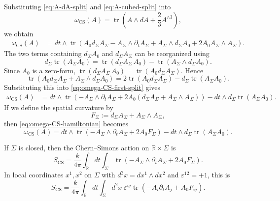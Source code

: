 \documentclass[11pt]{article}
\newcommand{\R}{\mathbb{R}}
\newcommand{\tr}{\operatorname{tr}}
\newcommand{\CS}{\operatorname{CS}}
\theoremstyle{definition}
\numberwithin{theorem}{section}
\numberwithin{equation}{section}
\let\del\partial
\begin{document}
\noindent Substituting \eqref{eq:A-dA-split} and \eqref{eq:A-cubed-split} into
\begin{equation*}
\omega_{\CS}(A) = \tr\left(A\wedge dA + \frac{2}{3}A^{\wedge 3}\right),
\end{equation*}
we obtain
\begin{align}
\omega_{\CS}(A)
&=
dt\wedge \tr\left(
A_0 d_\Sigma A_\Sigma
- A_\Sigma\wedge \del_t A_\Sigma
+ A_\Sigma\wedge d_\Sigma A_0
+ 2A_0A_\Sigma\wedge A_\Sigma\right).
\label{eq:omega-CS-first-split}
\end{align}
The two terms containing $d_\Sigma A_0$ and $d_\Sigma A_\Sigma$ can be reorganized using
\begin{equation*}
d_\Sigma\tr(A_\Sigma A_0)
=
\tr(d_\Sigma A_\Sigma\,A_0) - \tr(A_\Sigma\wedge d_\Sigma A_0).
\end{equation*}
Since $A_0$ is a zero-form, $\tr(d_\Sigma A_\Sigma\,A_0)=\tr(A_0 d_\Sigma A_\Sigma)$. Hence
\begin{equation*}
\tr(A_0 d_\Sigma A_\Sigma + A_\Sigma\wedge d_\Sigma A_0)
=
2\tr(A_0 d_\Sigma A_\Sigma) - d_\Sigma\tr(A_\Sigma A_0).
\end{equation*}
Substituting this into \eqref{eq:omega-CS-first-split} gives
\begin{align}
\omega_{\CS}(A)
&=
dt\wedge \tr\left(
-A_\Sigma\wedge \del_t A_\Sigma
+ 2A_0(d_\Sigma A_\Sigma + A_\Sigma\wedge A_\Sigma)\right)
- dt\wedge d_\Sigma\tr(A_\Sigma A_0).
\label{eq:omega-CS-hamiltonian}
\end{align}
If we define the spatial curvature by
\begin{equation*}
F_\Sigma := d_\Sigma A_\Sigma + A_\Sigma\wedge A_\Sigma,
\end{equation*}
then \eqref{eq:omega-CS-hamiltonian} becomes
\begin{equation}\label{eq:omega-CS-final-split}
\omega_{\CS}(A)
=
dt\wedge \tr\left(-A_\Sigma\wedge \del_t A_\Sigma + 2A_0F_\Sigma\right)
- dt\wedge d_\Sigma\tr(A_\Sigma A_0).
\end{equation}

\begin{proposition}\label{prop:CS-hamiltonian}
If $\Sigma$ is closed, then the Chern--Simons action on $\R\times \Sigma$ is
\begin{equation}\label{eq:CS-ham}
S_{\CS}
=
\frac{k}{4\pi}\int_\R dt\int_\Sigma \tr\left(-A_\Sigma\wedge \del_t A_\Sigma + 2A_0F_\Sigma\right).
\end{equation}
In local coordinates $x^1,x^2$ on $\Sigma$ with $d^2x = dx^1\wedge dx^2$ and $\varepsilon^{12}=+1$, this is
\begin{equation}\label{eq:CS-ham-components}
S_{\CS}
=
\frac{k}{4\pi}\int_\R dt\int_\Sigma d^2x\;
\varepsilon^{ij}\tr\left(-A_i\del_t A_j + A_0F_{ij}\right).
\end{equation}
\end{proposition}
\end{document}
